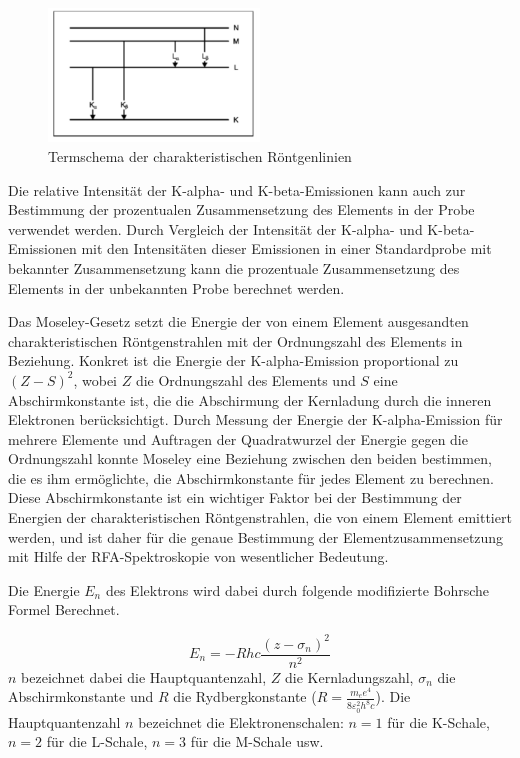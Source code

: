 \documentclass[12pt,english,ngerman]{scrartcl}
\begin{document}
\begin{figure}[H]
	\begin{center}
		\includegraphics[width =0.5\textwidth]{./figures/termschema_roentgenlinien.PNG}
	\end{center}
	\caption[Termschema der charakteristischen Röntgenlinien] {Termschema der
		charakteristischen Röntgenlinien \cite{koller_experimente_nodate}
	}\label{fig:termschema_roentgenlinien}
\end{figure}

Die relative Intensität der K-alpha- und K-beta-Emissionen kann auch zur
Bestimmung der prozentualen Zusammensetzung des Elements in der Probe verwendet
werden. Durch Vergleich der Intensität der K-alpha- und K-beta-Emissionen mit
den Intensitäten dieser Emissionen in einer Standardprobe mit bekannter
Zusammensetzung kann die prozentuale Zusammensetzung des Elements in der
unbekannten Probe berechnet werden.

Das Moseley-Gesetz setzt die Energie der von einem Element ausgesandten
charakteristischen Röntgenstrahlen mit der Ordnungszahl des Elements in
Beziehung. Konkret ist die Energie der K-alpha-Emission proportional zu $(Z -
	S)^2$, wobei $Z$ die Ordnungszahl des Elements und $S$ eine Abschirmkonstante
ist, die die Abschirmung der Kernladung durch die inneren Elektronen
berücksichtigt. Durch Messung der Energie der K-alpha-Emission für mehrere
Elemente und Auftragen der Quadratwurzel der Energie gegen die Ordnungszahl
konnte Moseley eine Beziehung zwischen den beiden bestimmen, die es ihm
ermöglichte, die Abschirmkonstante für jedes Element zu berechnen. Diese
Abschirmkonstante ist ein wichtiger Faktor bei der Bestimmung der Energien der
charakteristischen Röntgenstrahlen, die von einem Element emittiert werden, und
ist daher für die genaue Bestimmung der Elementzusammensetzung mit Hilfe der
RFA-Spektroskopie von wesentlicher Bedeutung.

Die Energie $E_n$ des Elektrons wird dabei durch folgende modifizierte Bohrsche
Formel Berechnet.

\begin{equation}
	E_n =-R h c \frac{\left(z-\sigma_n\right)^2}{n^2}
	\label{eq:energie_elektron}
\end{equation}
$n$ bezeichnet dabei die Hauptquantenzahl, $Z$ die Kernladungszahl, $\sigma_n$ die Abschirmkonstante
und $R$ die Rydbergkonstante ($R=\frac{m_e e^4}{8 \varepsilon_0^2 h^8 c}$).
Die Hauptquantenzahl $n$ bezeichnet die Elektronenschalen: $n=1$ für die K-Schale, $n=2$ für die L-Schale, $n=3$ für die M-Schale usw.
\end{document}
